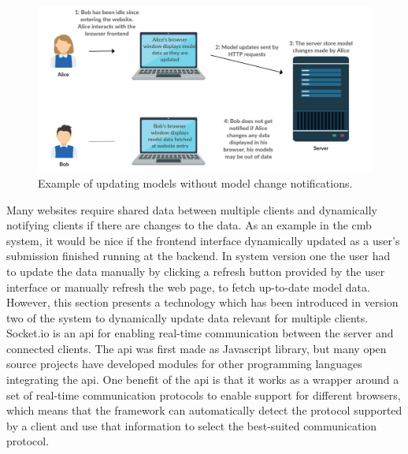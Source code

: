 \begin{figure}
    \centering
    \includegraphics[width=1\textwidth]{figs/update_problem.jpg}
    \caption{Example of updating models without model change notifications.}
    \label{fig:update-problem}
\end{figure}

Many websites require shared data between multiple clients and dynamically notifying clients if there are changes to the data. As an example in the \gls{cmb} system, it would be nice if the frontend interface dynamically updated as a user’s submission finished running at the backend. In system version one the user had to update the data manually by clicking a refresh button provided by the user interface or manually refresh the web page, to fetch up-to-date model data. However, this section presents a technology which has been introduced in version two of the system to dynamically update data relevant for multiple clients. \\

Socket.io \cite{SOCKETIO} is an \gls{api} for enabling real-time communication between the server and connected clients. The \gls{api} was first made as Javascript library, but many open source projects have developed modules for other programming languages integrating the \gls{api}. One benefit of the \gls{api} is that it works as a wrapper around a set of real-time communication protocols to enable support for different browsers, which means that the framework can automatically detect the protocol supported by a client and use that information to select the best-suited communication protocol. \\

